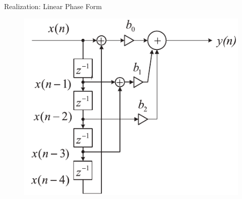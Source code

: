 \documentclass[pdflatex,compress,mathserif]{beamer}
\begin{document}
\begin{frame}{Realization: Linear Phase Form}
    \begin{figure}
        \centering
        \includegraphics[width=0.8\linewidth]{./img/img27.png}
    \end{figure}
\end{frame}
\end{document}

